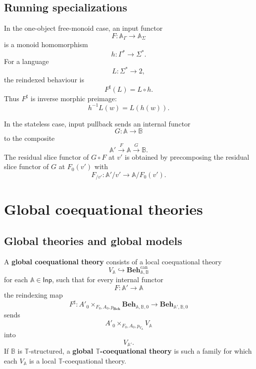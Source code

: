 \subsection{Running specializations}
\label{subsec:global-reindexing-running-specializations}

In the one-object free-monoid case, an input functor
\[
    F:\mathbb A_{\Gamma}\to\mathbb A_{\Sigma}
\]
is a monoid homomorphism
\[
    h:\Gamma^*\to\Sigma^*.
\]
For a language
\[
    L:\Sigma^*\to 2,
\]
the reindexed behaviour is
\[
    F^\sharp(L)=L\circ h.
\]
Thus \(F^\sharp\) is inverse morphic preimage:
\[
    h^{-1}L(w)=L(h(w)).
\]

In the stateless case, input pullback sends an internal functor
\[
    G:\mathbb A\to\mathbb B
\]
to the composite
\[
    \mathbb A'
    \xrightarrow{F}
    \mathbb A
    \xrightarrow{G}
    \mathbb B.
\]
The residual slice functor of \(G\circ F\) at \(v'\) is obtained by
precomposing the residual slice functor of \(G\) at \(F_0(v')\) with
\[
    F_{/v'}:\mathbb A'/v'\to\mathbb A/F_0(v').
\]

\section{Global coequational theories}
\label{sec:global-coequational-theories}

\subsection{Global theories and global models}
\label{subsec:global-theories-and-models}

\begin{definition}
\label{def:global-mealy-coequational-theory}
    A \textbf{global coequational theory} consists of a local coequational
    theory
    \[
        V_{\mathbb A}\hookrightarrow
        \mathbf{Beh}^{\mathrm{can}}_{\mathbb A,\mathbb B}
    \]
    for each \(\mathbb A\in\mathsf{Inp}\), such that for every internal functor
    \[
        F:\mathbb A'\to\mathbb A
    \]
    the reindexing map
    \[
        F^\sharp:
        A'_0\times_{F_0,A_0,p_{\mathbf{Beh}}}
        \mathbf{Beh}_{\mathbb A,\mathbb B,0}
        \to
        \mathbf{Beh}_{\mathbb A',\mathbb B,0}
    \]
    sends
    \[
        A'_0\times_{F_0,A_0,p_{V_{\mathbb A}}}V_{\mathbb A}
    \]
    into
    \[
        V_{\mathbb A'}.
    \]
    If \(\mathbb B\) is \(\mathbb T\)-structured, a \textbf{global
    \(\mathbb T\)-coequational theory} is such a family for which each
    \(V_{\mathbb A}\) is a local \(\mathbb T\)-coequational theory.
\end{definition}

